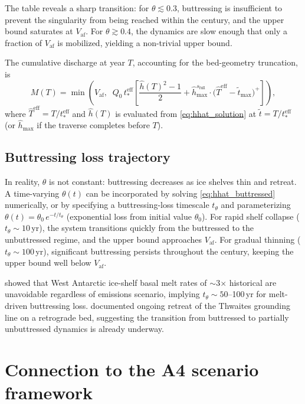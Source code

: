\documentclass[11pt]{article}
\newcommand{\hhat}{\hat{h}}
\newcommand{\That}{\hat{T}}
\newcommand{\Vaf}{V_{\mathrm{af}}}
\newcommand{\tdim}{\tilde{t}}
\begin{document}
The table reveals a sharp transition: for $\theta \lesssim 0.3$, buttressing is insufficient to prevent the singularity from being reached within the century, and the upper bound saturates at $\Vaf$. For $\theta \gtrsim 0.4$, the dynamics are slow enough that only a fraction of $\Vaf$ is mobilized, yielding a non-trivial upper bound.

The cumulative discharge at year $T$, accounting for the bed-geometry truncation, is
\begin{equation}
	M(T) = \min\!\left(\Vaf,\;\; Q_0\,t_*^{\mathrm{eff}}\left[\frac{\hhat(T)^2 - 1}{2} + \hhat_{\max}^{s_{\mathrm{full}}}\cdot\bigl(\That^{\mathrm{eff}} - \tdim_{\max}\bigr)^+\right]\right),
	\label{eq:M_buttressed}
\end{equation}
where $\That^{\mathrm{eff}} = T/t_*^{\mathrm{eff}}$ and $\hhat(T)$ is evaluated from \eqref{eq:hhat_solution} at $\tdim = T/t_*^{\mathrm{eff}}$ (or $\hhat_{\max}$ if the traverse completes before $T$).

\subsection{Buttressing loss trajectory}

In reality, $\theta$ is not constant: buttressing decreases as ice shelves thin and retreat. A time-varying $\theta(t)$ can be incorporated by solving \eqref{eq:hhat_buttressed} numerically, or by specifying a buttressing-loss timescale $t_\theta$ and parameterizing $\theta(t) = \theta_0\,e^{-t/t_\theta}$ (exponential loss from initial value $\theta_0$). For rapid shelf collapse ($t_\theta \sim 10$\,yr), the system transitions quickly from the buttressed to the unbuttressed regime, and the upper bound approaches $\Vaf$. For gradual thinning ($t_\theta \sim 100$\,yr), significant buttressing persists throughout the century, keeping the upper bound well below $\Vaf$.

\citet{Naughten2023} showed that West Antarctic ice-shelf basal melt rates of $\sim$3$\times$ historical are unavoidable regardless of emissions scenario, implying $t_\theta \sim 50$--100\,yr for melt-driven buttressing loss. \citet{Joughin2014} documented ongoing retreat of the Thwaites grounding line on a retrograde bed, suggesting the transition from buttressed to partially unbuttressed dynamics is already underway.


\section{Connection to the A4 scenario framework}
\label{sec:a4_connection}
\end{document}
